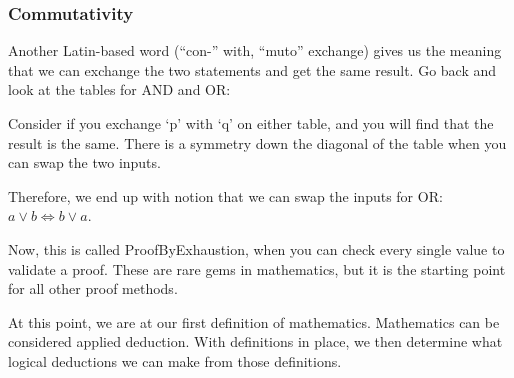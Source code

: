 \subsubsection{Commutativity}
Another Latin-based word (``con-'' with, ``muto'' exchange) gives us the meaning that we can exchange the two statements and get the same result. Go back and look at the tables for AND and OR:


\begin{table}[ht]
\centering
{}
\quad
{}
\end{table}

Consider if you exchange `p' with `q' on either table, and you will find that the result is the same. There is a symmetry down the diagonal of the table when you can swap the two inputs.

Therefore, we end up with notion that we can swap the inputs for OR: $a \vee b \iff b \vee a$.

Now, this is called \gls{ProofByExhaustion}, when you can check every single value to validate a proof. These are rare gems in mathematics, but it is the starting point for all other proof methods.

\begin{remark}
At this point, we are at our first definition of mathematics. Mathematics can be considered applied deduction. With definitions in place, we then determine what logical deductions we can make from those definitions.
\end{remark}

